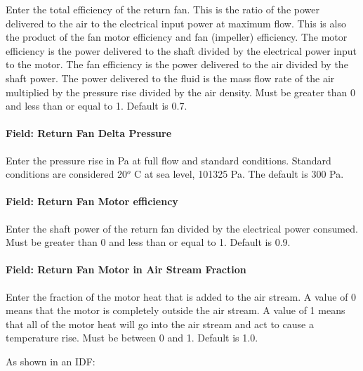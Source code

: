 Enter the total efficiency of the return fan. This is the ratio of the power delivered to the air to the electrical input power at maximum flow. This is also the product of the fan motor efficiency and fan (impeller) efficiency. The motor efficiency is the power delivered to the shaft divided by the electrical power input to the motor. The fan efficiency is the power delivered to the air divided by the shaft power. The power delivered to the fluid is the mass flow rate of the air multiplied by the pressure rise divided by the air density. Must be greater than 0 and less than or equal to 1. Default is 0.7.

\paragraph{Field: Return Fan Delta Pressure}\label{field-return-fan-delta-pressure-2}

Enter the pressure rise in Pa at full flow and standard conditions. Standard conditions are considered 20\(^{o}\) C at sea level, 101325 Pa. The default is 300 Pa.

\paragraph{Field: Return Fan Motor efficiency}\label{field-return-fan-motor-efficiency-2}

Enter the shaft power of the return fan divided by the electrical power consumed. Must be greater than 0 and less than or equal to 1. Default is 0.9.

\paragraph{Field: Return Fan Motor in Air Stream Fraction}\label{field-return-fan-motor-in-air-stream-fraction-2}

Enter the fraction of the motor heat that is added to the air stream. A value of 0 means that the motor is completely outside the air stream. A value of 1 means that all of the motor heat will go into the air stream and act to cause a temperature rise. Must be between 0 and 1. Default is 1.0.

As shown in an IDF:

